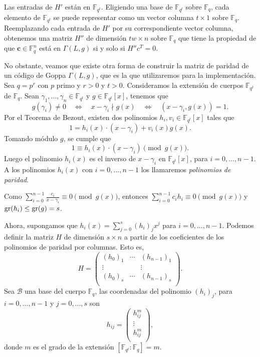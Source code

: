 Las entradas de $H'$ están en $\mathbb{F}_{q^t}$. Eligiendo una base de $\mathbb{F}_{q^t}$ sobre $\mathbb{F}_q$, cada elemento de $\mathbb{F}_{q^t}$ se puede representar como un vector columna $t \times 1$ sobre $\mathbb{F}_q$. Reemplazando cada entrada de $H'$ por su correspondiente vector columna, obtenemos una matriz $H''$ de dimensión $tw \times n$ sobre $\mathbb{F}_{q}$ que tiene la propiedad de que $\textbf{c} \in \mathbb{F}_q^n$ está en $\Gamma(L,g)$ si y solo si $H''c^T = 0$.

No obstante, veamos que existe otra forma de construir la matriz de paridad de un código de Goppa $\Gamma(L, g)$, que es la que utilizaremos para la implementación. Sea $q = p^r$ con $p$ primo y $r > 0$ y $t > 0$. Consideramos la extensión de cuerpos $\mathbb{F}_{q^t}$ de $\mathbb{F}_q$. Sean $\gamma_1, ..., \gamma_n \in \mathbb{F}_{q^t}$ y $g \in \mathbb{F}_{q^t}[x]$, tenemos que
\[
    g(\gamma_i) \neq 0 \quad \Leftrightarrow \quad x - \gamma_i \nmid g(x) \quad \Leftrightarrow \quad (x - \gamma_i, g(x)) = 1.
\]
Por el Teorema de Bezout, existen dos polinomios $h_i, v_i \in \mathbb{F}_{q^t}[x]$ tales que
\[
    1 = h_i(x) \cdot (x - \gamma_i) + v_i(x)g(x).
\]
Tomando módulo $g$, se cumple que
\[
    1 \equiv h_i(x) \cdot (x - \gamma_i) \pmod{g(x)}.
\]
Luego el polinomio $h_i(x)$ es el inverso de $x - \gamma_i$ en $\mathbb{F}_{q^t}[x]$, para $i = 0,..., n-1$. A los polinomios $h_i(x)$ con $i = 0, ..., n-1$ los llamaremos \emph{polinomios de paridad}.

Como $\sum_{i=0}^{n-1} \frac{c_i}{x - \gamma_i} \equiv 0 \pmod{g(x)}$, entonces $\sum_{i=0}^{n-1}c_i h_i \equiv 0 \pmod{g(x)}$ y $\operatorname{gr}(h_i) \leq \operatorname{gr}(g) = s$.

Ahora, supongamos que $h_i(x) = \sum_{j=0}^s (h_i)_j x^j$ para $i = 0,...,n-1$. Podemos definir la matriz $H$ de dimensión $s \times n$ a partir de los coeficientes de los polinomios de paridad por columnas. Esto es,
\[
   H = \left(
            \begin{array}{ccc} 
                (h_0)_1 & \cdots & (h_{n-1})_1  \\
                \vdots &  & \vdots \\
                (h_0)_s & \cdots & (h_{n-1})_s \\
            \end{array}
            \right).
\]
Sea $\mathcal{B}$ una base del cuerpo $\mathbb{F}_{q}$, las coordenadas del polinomio $(h_i)_j$, para $i = 0,...,n-1$ y $j = 0,...,s$ son
\[
    h_{ij} = \left(
        \begin{array}{c} 
            h_{ij}^m \\
            \vdots  \\
            h_{ij}^m \\
        \end{array}
        \right),
\]
donde $m$ es el grado de la extensión $[\mathbb{F}_{q^t} : \mathbb{F}_{q}] = m$.

